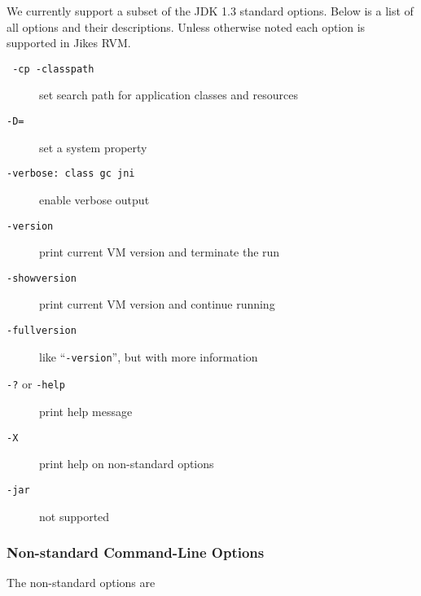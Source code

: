We currently support a subset of the JDK 1.3 standard options.  Below
is a list of all options and their descriptions.  Unless otherwise noted each
option is supported in Jikes RVM.\@
\begin{description}
\item[{\tt \Mlbr{} -cp \Mor{} -classpath \Mrbr{} }]
set search path for application classes and resources

\item[{\tt -D=}] set a system property

\item[{\tt -verbose:\Mlsq{} class \Mor{} gc \Mor{} jni \Mrsq}]
enable verbose output

\item[{\tt -version}] print current VM version and terminate the run

\item[{\tt -showversion}] print current VM version and continue running

\item[{\tt -fullversion}] like ``{\tt -version}'', but with more information

\item[{\tt -?} or {\tt -help}] print help message

\item[{\tt -X}] print help on non-standard options

\item[{\tt -jar}] not supported

\end{description}

\subsubsection{Non-standard Command-Line Options}

The non-standard options are

